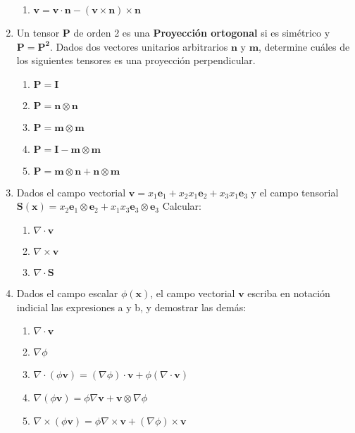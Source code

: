 \documentclass[12pt,a4paper]{article}
\begin{document}
\begin{enumerate}
    \begin{enumerate}
        \item $\mathbf{v}=\mathbf{v}\cdot\mathbf{n}-(\mathbf{v} \times \mathbf{n})\times \mathbf{n}$
    \end{enumerate}
    \item Un tensor $\mathbf{P}$ de orden 2  es una \textbf{Proyección ortogonal} si es simétrico y $\mathbf{P=P^2}$. Dados dos vectores unitarios arbitrarios $\mathbf{n}$ y $\mathbf{m}$, determine cuáles de los siguientes tensores es una proyección perpendicular.
    \begin{enumerate}
        \item $\mathbf{P}=\mathbf{I}$
        \item $\mathbf{P}=\mathbf{n}\otimes\mathbf{n}$
        \item $\mathbf{P}=\mathbf{m}\otimes\mathbf{m}$
        \item $\mathbf{P}=\mathbf{I}-\mathbf{m}\otimes\mathbf{m}$
        \item $\mathbf{P}=\mathbf{m}\otimes\mathbf{n}+\mathbf{n}\otimes\mathbf{m}$
    \end{enumerate}
    \item Dados el campo vectorial 
        $\mathbf{v}=x_1 \mathbf{e}_1+x_2 x_1 \mathbf{e}_2+x_3 x_1 \mathbf{e}_3$ y el campo tensorial
        \\$\mathbf{S} (\mathbf{x})=x_2 \mathbf{e}_1\otimes\mathbf{e}_2+x_1 x_3 \mathbf{e}_3\otimes\mathbf{e}_3$ Calcular:
    \begin{enumerate}
        \item $\nabla\cdot\mathbf{v}$
        \item $\nabla\times\mathbf{v}$
        \item $\nabla\cdot\mathbf{S}$
    \end{enumerate}
    \item Dados el campo escalar $\phi(\mathbf{x})$, el campo vectorial $\mathbf{v}$ escriba en notación indicial las expresiones a y b, y demostrar las demás:
    \begin{enumerate}
        \item $\nabla\cdot\mathbf{v}$
        \item $\nabla\phi$
        \item $\nabla\cdot (\phi\mathbf{v})= (\nabla\phi)\cdot\mathbf{v}+\phi(\nabla\cdot\mathbf{v})$
        \item $\nabla(\phi\mathbf{v}) = \phi\nabla\mathbf{v} + \mathbf{v}\otimes\nabla\phi$
        \item $\nabla\times(\phi\mathbf{v}) =\phi\nabla\times\mathbf{v} + (\nabla\phi)\times\mathbf{v}$
    

\end{enumerate}
\end{enumerate}
\end{document}

